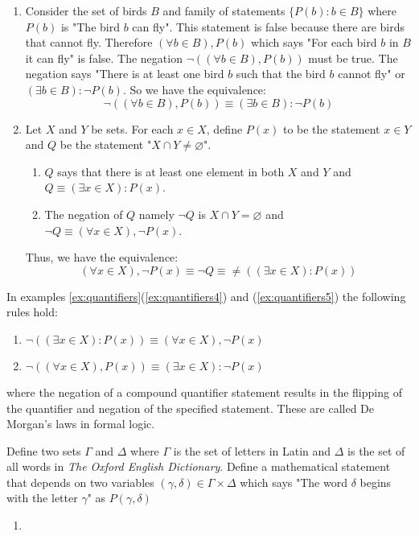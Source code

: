 \begin{example}
\begin{enumerate}
        \item Consider the set of birds $B$ and family of statements $\{P(b) : b \in B\}$ where $P(b)$ is "The bird $b$ can fly". This statement is false because there are birds that cannot fly. Therefore $(\forall b \in B), P(b)$ which says "For each bird $b$ in $B$ it can fly" is false. The negation $\neg ((\forall b \in B),P(b))$ must be true. The negation says "There is at least one bird $b$ such that the bird $b$ cannot fly" or $(\exists b \in B): \neg P(b)$. So we have the equivalence:
            $$
            \neg((\forall b \in B), P(b)) \equiv (\exists b \in B):\neg P(b)
            $$
            \label{ex:quantifiers4}

        \item Let $X$ and $Y$ be sets. For each $x \in X$, define $P(x)$ to be the statement $x \in Y$ and $Q$ be the statement "$X \cap Y \neq \varnothing$".
            \begin{enumerate}[label=(\alph*)]
                \item $Q$ says that there is at least one element in both $X$ and $Y$ and $Q \equiv (\exists x \in X): P(x)$.
                \item The negation of $Q$ namely $\neg Q$ is $X \cap Y = \varnothing$ and $\neg Q \equiv (\forall x \in X), \neg P(x)$.
            \end{enumerate}
            Thus, we have the equivalence: \label{ex:quantifiers5}
            $$
            (\forall x \in X), \neg P(x) \equiv \neg Q \equiv \neq((\exists x \in X) : P(x))
            $$
    \end{enumerate}
    \label{ex:quantifiers}
\end{example}

In examples \ref{ex:quantifiers}(\ref{ex:quantifiers4}) and (\ref{ex:quantifiers5}) the following rules hold:

\begin{enumerate}
    \item $\neg((\exists x \in X): P(x)) \equiv (\forall x \in X), \neg P(x)$
    \item $\neg((\forall x \in X), P(x)) \equiv (\exists x \in X): \neg P(x)$
\end{enumerate}

\noindent where the negation of a compound quantifier statement results in the flipping of the quantifier and negation of the specified statement. These are called De Morgan's laws in formal logic.

\begin{example}
    Define two sets $\Gamma$ and $\Delta$ where $\Gamma$ is the set of letters in Latin and $\Delta$ is the set of all words in \textit{The Oxford English Dictionary}. 
    Define a mathematical statement that depends on two variables $(\gamma,\delta) \in \Gamma \times \Delta$ which says "The word $\delta$ begins with the letter $\gamma$" as $P(\gamma,\delta)$

    \begin{enumerate}
        \item 
    \end{enumerate}

\end{example}